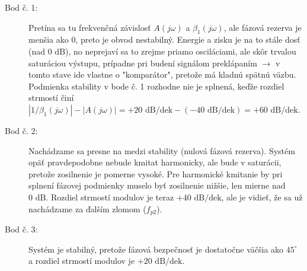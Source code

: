 \begin{description}
	\item[Bod č. 1:] Pretína sa tu frekvenčná závislosť $A(j\omega)$ a $\beta_1 (j\omega)$, ale fázová rezerva je menšia ako $0$, preto je obvod nestabilný. Energie a zisku je na to stále dosť (nad $0\text{ dB}$), no neprejaví sa to zrejme priamo osciláciami, ale skôr trvalou saturáciou výstupu, prípadne pri budení signálom preklápaním $\rightarrow$ v tomto stave ide vlastne o "komparátor", pretože má kladnú spätnú väzbu. Podmienka stability v bode č. 1 rozhodne nie je splnená, keďže rozdiel strmostí činí $|1/\beta_1(j\omega)| - |A(j\omega)| = +20\text{ dB/dek} - (-40\text{ dB/dek}) = +60\text{ dB/dek}$.
	
	\item[Bod č. 2:] Nachádzame sa presne na medzi stability (nulová fázová rezerva). Systém opäť pravdepodobne nebude kmitat harmonicky, ale bude v saturácii, pretože zosilnenie je pomerne vysoké. Pre harmonické kmitanie by pri splnení fázovej podmienky muselo byť zosilnenie nižšie, len mierne nad $0\text{ dB}$. Rozdiel strmostí modulov je teraz $+40\text{ dB/dek}$, ale je vidieť, že sa už nachádzame za ďalším zlomom ($f_{p2}$).
	
	\item[Bod č. 3:] Systém je stabilný, pretože fázová bezpečnosť je dostatočne väčšia ako $45^\circ$ a rozdiel strmostí modulov je $+20\text{ dB/dek}$.
\end{description}
